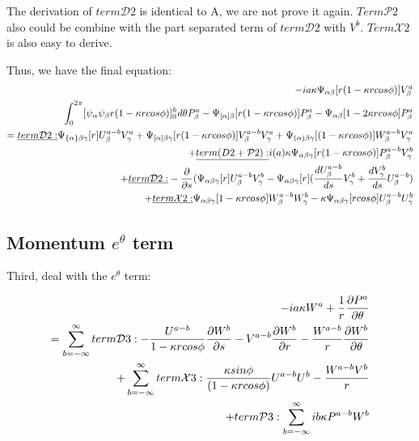 \documentclass{Note}
\begin{document}
The derivation of $term\mathcal{D}2$ is identical to A, we are not prove it again. $Term\mathcal{P}2$ also could be combine with the part separated term of  $term\mathcal{D}2$ with $V^b$.  $Term\mathcal{X}2$ is also easy to derive.


Thus, we have the final equation:
\begin{equation}
\begin{aligned}
-ia\kappa \Psi_{\alpha\beta}[r(1-\kappa rcos\phi)]V_\beta^a\\
\int_0^{2\pi}  [{\psi_\alpha \psi_\beta   r(1-\kappa r cos\phi)}]_0^h d\theta P_\beta^a
-\Psi_{[\alpha]\beta}[r(1-\kappa r cos\phi)]P_\beta^a-\Psi_{\alpha\beta}[1-2\kappa r cos\phi]P_\beta^a\\
=
\underline{term \mathcal{D}2:}  \Psi_{\{\alpha\}\beta\gamma} [r]U_\beta^{a-b}V_\gamma^a
+\Psi_{[\alpha]\beta\gamma} [r(1-\kappa rcos\phi)]V_\beta^{a-b}V_\gamma^a
+ \Psi_{(\alpha)\beta\gamma} [(1-\kappa rcos\phi)]W_\beta^{a-b}V_\gamma^a\\
+\underline{term\mathcal({D}2+\mathcal{P}2):}  i(a)\kappa \Psi_{\alpha\beta\gamma}[r(1-\kappa r cos\phi)]P_\beta^{a-b}V_\gamma^{b}\\
+\underline{term \mathcal{D}2:} -{{\partial }\over {\partial s}}(\Psi_{\alpha\beta\gamma}[r]U_\beta^{a-b}V_\gamma^{b}
-\Psi_{\alpha\beta\gamma}[r]({{d U_\beta^{a-b} \over {d s}}V_\gamma^{b}}+{dV_\gamma^{b}\over ds}U_\beta^{a-b})\\
+\underline{term \mathcal{X}2:} \Psi_{\alpha\beta\gamma}[1-\kappa rcos\phi]W_\beta^{a-b}W_\gamma^b-\kappa \Psi_{\alpha\beta\gamma}[r cos\phi]U_\beta^{a-b}U_\gamma^b\\
\end{aligned}
\end{equation}



\subsection{Momentum $e^\theta$ term}

Third, deal with the $e^\theta$ term:

\begin{equation}
\begin{aligned}
-ia\kappa W^a+{1\over r}{\partial P^a\over {\partial \theta}}\\
=
\sum_{b=-\infty}^{\infty}
term\mathcal{D}3: -{U^{a-b}\over {1-\kappa r cos\phi}}  {{\partial W^b} \over {\partial s}}-V^{a-b}{{\partial W^b}\over{\partial r}}-{W^{a-b}\over r}{{\partial W^b}\over {\partial \theta}}\\
+ \sum_{b=-\infty}^{\infty}
term\mathcal{X}3: {\kappa sin\phi \over{(1-\kappa r cos\phi)}}U^{a-b}U^b-{W^{a-b}V^b\over{r}}\\
+term\mathcal{P}3:  \sum_{b=-\infty}^{\infty}
ib\kappa P^{a-b}W^{b}
\end{aligned}
\end{equation}
\end{document}
